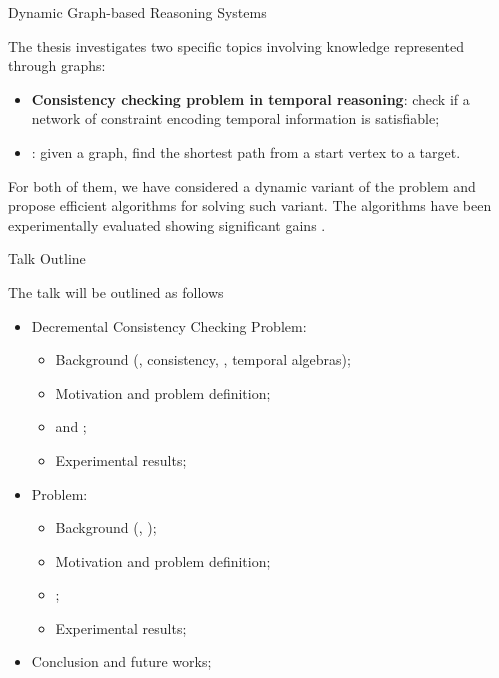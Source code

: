 \begin{frame}{Dynamic Graph-based Reasoning Systems}

    The thesis investigates two specific topics involving knowledge represented through graphs:

    \begin{itemize}
        \item \textbf{Consistency checking problem in temporal reasoning}: check if a network of constraint encoding temporal information is satisfiable;
        \item \textbf{\Pathfinding{}}: given a graph, find the shortest path from a start vertex to a target.
    \end{itemize}

    For both of them, we have considered a dynamic variant of the problem and propose efficient algorithms for solving such variant. 
    The algorithms have been experimentally evaluated showing significant gains \wrt{} \stateofart{}.
\end{frame}

\begin{frame}{Talk Outline}

    The talk will be outlined as follows
    \begin{itemize}
        \item Decremental Consistency Checking Problem:
        \begin{itemize}
            \item Background (\CSPName{}, consistency, \tlGraphName{}, temporal algebras);
            \item Motivation and problem definition;
            \item \DPASATAlgorithmName{} and \DOHSATAlgorithmName{};
            \item Experimental results;
        \end{itemize}
        \item \SAPFEC{} Problem:
        \begin{itemize}
            \item Background (\pathfinding{}, \CPD{});
            \item Motivation and problem definition;
            \item \CPDSearch{};
            \item Experimental results;
        \end{itemize}
        \item Conclusion and future works;
    \end{itemize}
\end{frame}